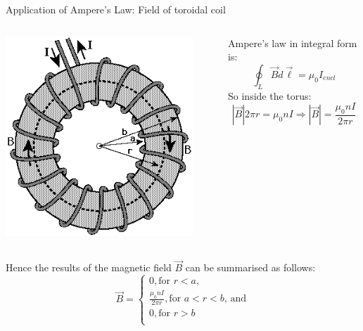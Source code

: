 \begin{frame}{Application of Ampere's Law: Field of toroidal coil}

\begin{columns}
  \begin{column}{0.33\textwidth}
    \begin{center}
     \includegraphics[width=0.90\textwidth]{./images/schematics/toroidal_coil_magnetic_field.png}\\
    \end{center}
  \end{column}
  \begin{column}{0.67\textwidth}
     Ampere's law in integral form is:
     \begin{equation*}
        \oint_{L} \vec{B} d\vec{\ell} = \mu_0 I_{encl}
     \end{equation*}
     So inside the torus:
     \begin{equation*}
         |\vec{B}| 2\pi r = \mu_0 n I \Rightarrow  |\vec{B}| = \frac{\mu_0 n I}{2\pi r}
     \end{equation*}

  \end{column}
\end{columns}

Hence the results of the magnetic field $\vec{B}$
can be summarised as follows:
    \begin{equation*}
      \vec{B} = \left\{ \begin{array}{l}
             0, \text{for $r < a$,} \\
             \frac{\mu_0 n I}{2\pi r}, \text{for $a < r < b$, and} \\
             0, \text{for $r > b$} \\
        \end{array} \right.
    \end{equation*}

\end{frame}


